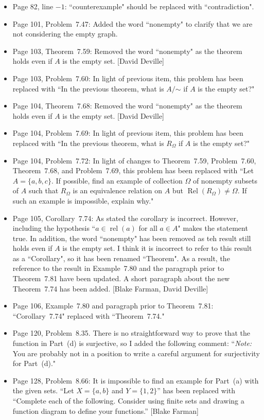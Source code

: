 \documentclass[11pt]{article}%
\DeclareMathOperator{\rel}{rel}
\newcommand{\Rel}{\operatorname{Rel}}
\begin{document}
\begin{itemize}
\item Page 82, line $-1$: ``counterexample" should be replaced with ``contradiction". 
\item Page 101, Problem~7.47: Added the word ``nonempty" to clarify that we are not considering the empty graph.
\item Page 103, Theorem~7.59: Removed the word ``nonempty" as the theorem holds even if $A$ is the empty set. [David Deville]
\item Page 103, Problem~7.60: In light of previous item, this problem has been replaced  with ``In the previous theorem, what is $A/\mathord\sim$ if $A$ is the empty set?"
\item Page 104, Theorem~7.68: Removed the word ``nonempty" as the theorem holds even if $A$ is the empty set. [David Deville]
\item Page 104, Problem~7.69: In light of previous item, this problem has been replaced  with ``In the previous theorem, what is $R_{\Omega}$ if $A$ is the empty set?"
\item Page 104, Problem~7.72: In light of changes to Theorem~7.59, Problem~7.60, Theorem~7.68, and Problem~7.69, this problem has been replaced  with ``Let $A=\{a,b,c\}$. If possible, find an example of collection $\Omega$ of nonempty subsets of $A$ such that $R_{\Omega}$ is an equivalence relation on $A$ but $\Rel(R_{\Omega})\neq \Omega$.  If such an example is impossible, explain why."
\item Page 105, Corollary~7.74: As stated the corollary is incorrect. However, including the hypothesis ``$a\in\rel(a)$ for all $a\in A$" makes the statement true. In addition, the word ``nonempty" has been removed as teh result still holds even if $A$ is the empty set. I think it is incorrect to refer to this result as a ``Corollary", so it has been renamed ``Theorem". As a result, the reference to the result in Example~7.80 and the paragraph prior to Theorem~7.81 have been updated. A short paragraph about the new Theorem~7.74 has been added. [Blake Farman, David Deville]
\item Page 106, Example~7.80 and paragraph prior to Theorem~7.81: ``Corollary~7.74" replaced with ``Theorem~7.74."
\item Page 120, Problem~8.35. There is no straightforward way to prove that the function in Part~(d) is surjective, so I added the following comment: ``\emph{Note:} You are probably not in a position to write a careful argument for surjectivity for Part~(d)."  
\item Page 128, Problem~8.66: It is impossible to find an example for Part~(a) with the given sets.  ``Let $X=\{a,b\}$ and $Y=\{1,2\}$'' has been replaced with ``Complete each of the following. Consider using finite sets and drawing a function diagram to define your functions.'' [Blake Farman]

\end{itemize}
\end{document}
